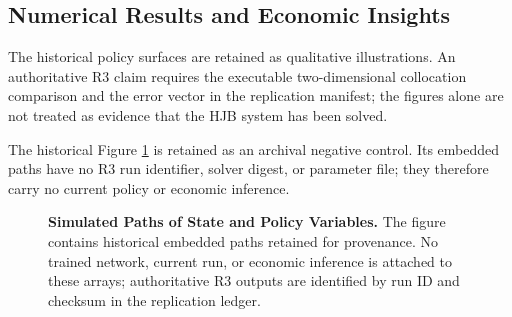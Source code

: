 \documentclass[ecta]{econsocart}
\theoremstyle{plain}
\theoremstyle{remark}
\begin{document}
\subsection{Numerical Results and Economic Insights}
The historical policy surfaces are retained as qualitative illustrations. An authoritative R3 claim requires the executable two-dimensional collocation comparison and the error vector in the replication manifest; the figures alone are not treated as evidence that the HJB system has been solved.

The historical Figure \ref{fig:ndu_path} is retained as an archival negative control. Its embedded paths have no R3 run identifier, solver digest, or parameter file; they therefore carry no current policy or economic inference.

\begin{figure}[H]
\centering
{}
\caption{\textbf{Simulated Paths of State and Policy Variables.} The figure contains historical embedded paths retained for provenance. No trained network, current run, or economic inference is attached to these arrays; authoritative R3 outputs are identified by run ID and checksum in the replication ledger.}
\label{fig:ndu_path}
\end{figure}
\end{document}
